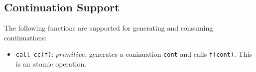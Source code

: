 \subsection*{Continuation Support}
\label{conc_supp}
The following functions are supported for generating and consuming continuations:

\begin{itemize}
\item \texttt{call\_cc(f)}: \(\textit{primitive}\), generates a coninuation \texttt{cont} and calls \texttt{f(cont)}. This is an atomic operation.
\end{itemize}
